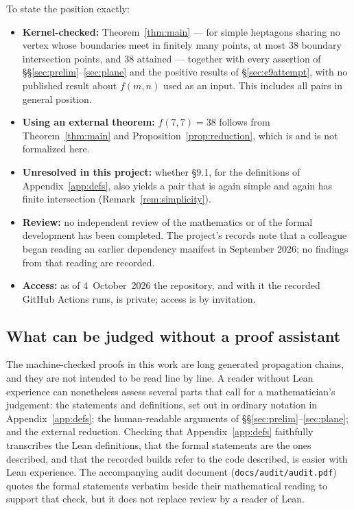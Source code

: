 \documentclass[11pt,a4paper]{article}
\theoremstyle{plain}
\theoremstyle{definition}
\theoremstyle{remark}
\begin{document}
To state the position exactly:

\begin{itemize}[leftmargin=*]
  \item \textbf{Kernel-checked:} Theorem~\ref{thm:main} --- for simple
    heptagons sharing no vertex whose boundaries meet in finitely many points,
    at most $38$ boundary intersection points, and $38$ attained --- together
    with every assertion of \S\S\ref{sec:prelim}--\ref{sec:plane} and the
    positive results of \S\ref{sec:e9attempt}, with no published result about
    $f(m,n)$ used as an input. This includes all pairs in general position.
  \item \textbf{Using an external theorem:} $f(7,7)=38$ follows from
    Theorem~\ref{thm:main} and Proposition~\ref{prop:reduction}, which is
    \cite[\S9.1]{AckermanKeszeghRote2022} and is not formalized here.
  \item \textbf{Unresolved in this project:} whether \S9.1, for the
    definitions of Appendix~\ref{app:defs}, also yields a pair that is again
    simple and again has finite intersection (Remark~\ref{rem:simplicity}).
  \item \textbf{Review:} no independent review of the mathematics or of the
    formal development has been completed. The project's records note that a
    colleague began reading an earlier dependency manifest in September 2026;
    no findings from that reading are recorded.
  \item \textbf{Access:} as of 4~October~2026 the repository, and with it the
    recorded GitHub Actions runs, is private; access is by invitation.
\end{itemize}

\subsection{What can be judged without a proof assistant}

The machine-checked proofs in this work are long generated propagation
chains, and they are not intended to be read line by line. A reader without
Lean experience can nonetheless assess several parts that call for a
mathematician's judgement: the statements and definitions, set out in ordinary
notation in Appendix~\ref{app:defs}; the human-readable arguments of
\S\S\ref{sec:prelim}--\ref{sec:plane}; and the external reduction. Checking
that Appendix~\ref{app:defs} faithfully transcribes the Lean definitions, that
the formal statements are the ones described, and that the recorded builds
refer to the code described, is easier with Lean experience. The accompanying
audit document (\texttt{docs/audit/audit.pdf}) quotes the formal statements
verbatim beside their mathematical reading to support that check, but it does
not replace review by a reader of Lean.
\end{document}
